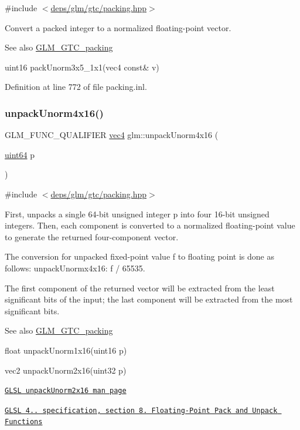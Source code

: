 {\ttfamily \#include $<$\hyperlink{gtc_2packing_8hpp}{deps/glm/gtc/packing.\+hpp}$>$}

Convert a packed integer to a normalized floating-\/point vector.

\begin{DoxySeeAlso}{See also}
\hyperlink{group__gtc__packing}{G\+L\+M\+\_\+\+G\+T\+C\+\_\+packing} 

uint16 pack\+Unorm3x5\+\_\+1x1(vec4 const\& v) 
\end{DoxySeeAlso}


Definition at line 772 of file packing.\+inl.

\mbox{\label{group__gtc__packing_gafb2b502bc406031a5618ce930139a9e3}} 
\subsubsection{\texorpdfstring{unpack\+Unorm4x16()}{unpackUnorm4x16()}}
{\footnotesize\ttfamily G\+L\+M\+\_\+\+F\+U\+N\+C\+\_\+\+Q\+U\+A\+L\+I\+F\+I\+ER \hyperlink{group__core__types_ga5881b1b022d7fd1b7218f5916532dd02}{vec4} glm\+::unpack\+Unorm4x16 (\begin{DoxyParamCaption}\item[{\hyperlink{group__gtc__type__precision_gae3632bf9b37da66233d78930dd06378a}{uint64}}]{p }\end{DoxyParamCaption})}



{\ttfamily \#include $<$\hyperlink{gtc_2packing_8hpp}{deps/glm/gtc/packing.\+hpp}$>$}

First, unpacks a single 64-\/bit unsigned integer p into four 16-\/bit unsigned integers. Then, each component is converted to a normalized floating-\/point value to generate the returned four-\/component vector.

The conversion for unpacked fixed-\/point value f to floating point is done as follows\+: unpack\+Unormx4x16\+: f / 65535.

The first component of the returned vector will be extracted from the least significant bits of the input; the last component will be extracted from the most significant bits.

\begin{DoxySeeAlso}{See also}
\hyperlink{group__gtc__packing}{G\+L\+M\+\_\+\+G\+T\+C\+\_\+packing} 

float unpack\+Unorm1x16(uint16 p) 

vec2 unpack\+Unorm2x16(uint32 p) 

\href{http://www.opengl.org/sdk/docs/manglsl/xhtml/unpackUnorm2x16.xml}{\tt G\+L\+SL unpack\+Unorm2x16 man page} 

\href{http://www.opengl.org/registry/doc/GLSLangSpec.4.20.8.pdf}{\tt G\+L\+SL 4.. specification, section 8. Floating-\/\+Point Pack and Unpack Functions} 
\end{DoxySeeAlso}


